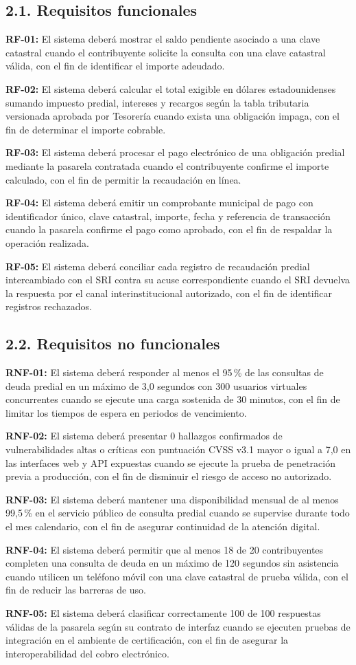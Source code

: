 \documentclass[conference,onecolumn]{IEEEtran}
\newcommand{\req}[2]{\par\noindent\textbf{#1:} #2\par\smallskip}
\begin{document}
\subsection*{2.1. Requisitos funcionales}
\req{RF-01}{El sistema deberá mostrar el saldo pendiente asociado a una clave catastral cuando el contribuyente solicite la consulta con una clave catastral válida, con el fin de identificar el importe adeudado.}
\req{RF-02}{El sistema deberá calcular el total exigible en dólares estadounidenses sumando impuesto predial, intereses y recargos según la tabla tributaria versionada aprobada por Tesorería cuando exista una obligación impaga, con el fin de determinar el importe cobrable.}
\req{RF-03}{El sistema deberá procesar el pago electrónico de una obligación predial mediante la pasarela contratada cuando el contribuyente confirme el importe calculado, con el fin de permitir la recaudación en línea.}
\req{RF-04}{El sistema deberá emitir un comprobante municipal de pago con identificador único, clave catastral, importe, fecha y referencia de transacción cuando la pasarela confirme el pago como aprobado, con el fin de respaldar la operación realizada.}
\req{RF-05}{El sistema deberá conciliar cada registro de recaudación predial intercambiado con el SRI contra su acuse correspondiente cuando el SRI devuelva la respuesta por el canal interinstitucional autorizado, con el fin de identificar registros rechazados.}


\subsection*{2.2. Requisitos no funcionales}
\req{RNF-01}{El sistema deberá responder al menos el 95\,\% de las consultas de deuda predial en un máximo de 3,0 segundos con 300 usuarios virtuales concurrentes cuando se ejecute una carga sostenida de 30 minutos, con el fin de limitar los tiempos de espera en periodos de vencimiento.}
\req{RNF-02}{El sistema deberá presentar 0 hallazgos confirmados de vulnerabilidades altas o críticas con puntuación CVSS v3.1 mayor o igual a 7,0 en las interfaces web y API expuestas cuando se ejecute la prueba de penetración previa a producción, con el fin de disminuir el riesgo de acceso no autorizado.}
\req{RNF-03}{El sistema deberá mantener una disponibilidad mensual de al menos 99,5\,\% en el servicio público de consulta predial cuando se supervise durante todo el mes calendario, con el fin de asegurar continuidad de la atención digital.}
\req{RNF-04}{El sistema deberá permitir que al menos 18 de 20 contribuyentes completen una consulta de deuda en un máximo de 120 segundos sin asistencia cuando utilicen un teléfono móvil con una clave catastral de prueba válida, con el fin de reducir las barreras de uso.}
\req{RNF-05}{El sistema deberá clasificar correctamente 100 de 100 respuestas válidas de la pasarela según su contrato de interfaz cuando se ejecuten pruebas de integración en el ambiente de certificación, con el fin de asegurar la interoperabilidad del cobro electrónico.}
\end{document}

